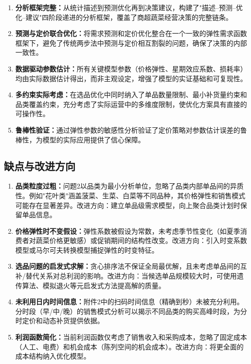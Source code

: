 \documentclass[12pt,a4paper]{ctexart}
\begin{document}
\begin{enumerate}[label=(\arabic*), leftmargin=*]
    \item \textbf{分析框架完整：}从统计描述到预测优化再到决策建议，构建了"描述--预测--优化--建议"四阶段递进的分析框架，覆盖了商超蔬菜经营决策的完整链条。
    \item \textbf{预测与定价联合优化：}将需求预测和定价优化整合在一个一致的弹性需求函数框架下，避免了传统两步法中预测与定价相互割裂的问题，确保了决策的内部一致性。
    \item \textbf{数据驱动参数估计：}所有关键模型参数（价格弹性、星期效应系数、损耗率）均由实际数据估计得出，而非主观设定，增强了模型的实证基础和可复现性。
    \item \textbf{多约束实际考虑：}在选品优化中同时纳入了单品数量限制、最小补货量约束和品类覆盖约束，充分考虑了实际运营中的多维度限制，使优化方案具有直接的可操作性。
    \item \textbf{鲁棒性验证：}通过弹性参数的敏感性分析验证了定价策略对参数估计误差的鲁棒性，为模型的实际应用提供了信心保障。
\end{enumerate}

\subsection{缺点与改进方向}

\begin{enumerate}[label=(\arabic*), leftmargin=*]
    \item \textbf{品类粒度过粗：}问题2以品类为最小分析单位，忽略了品类内部单品间的异质性。例如"花叶类"涵盖菠菜、生菜、白菜等不同品种，其价格弹性和销售模式可能存在显著差异。改进方向：建立单品级需求模型，向上聚合品类计划时保留单品信息。
    \item \textbf{价格弹性时不变假设：}弹性系数被假设为常数，未考虑季节性变化（如夏季消费者对蔬菜价格更敏感）或促销期间的结构性改变。改进方向：引入时变系数模型或马尔可夫转换模型捕捉弹性的时变特征。
    \item \textbf{选品问题的启发式求解：}贪心排序法不保证全局最优解，且未考虑单品间的互补/替代关系对总利润的影响。改进方向：当候选单品规模较大时，可使用遗传算法、模拟退火等元启发式方法提高解的质量。
    \item \textbf{未利用日内时间信息：}附件2中的扫码时间信息（精确到秒）未被充分利用。分时段（早/中/晚）的销售模式分析可以揭示不同品类的购买高峰时段，为分时定价和动态补货提供依据。
    \item \textbf{利润函数简化：}当前利润函数仅考虑了销售收入和采购成本，忽略了固定成本（人工、电费）和机会成本（陈列空间的机会成本）。改进方向：将更全面的成本结构纳入优化模型。
\end{enumerate}
\end{document}
